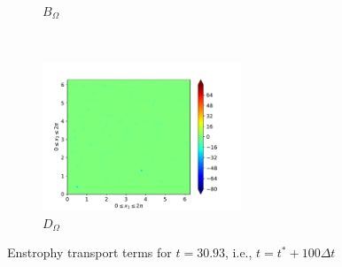 \begin{figure}[H]
\begin{subfigure}{0.45\textwidth}
        \caption{$B_{\Omega}$}
    \end{subfigure}
    ~
    \begin{subfigure}{0.45\textwidth}
        \includegraphics[height=1.75in]{media/run-cds-65/D-enst-1440}
        \caption{$D_{\Omega}$}
    \end{subfigure}
    \caption{Enstrophy transport terms for $t=30.93$, i.e., $t=t^{\ast} + 100 \Delta t$}
\end{figure}

\newpage

